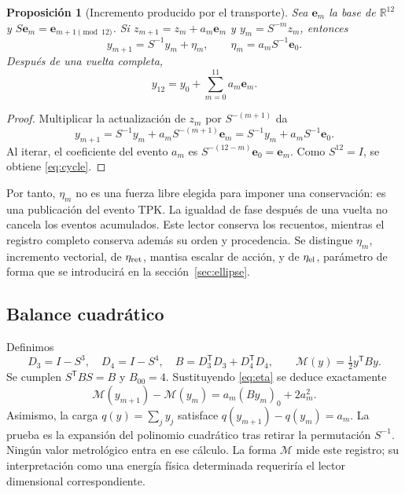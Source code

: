 \documentclass[11pt,a4paper]{article}
\numberwithin{equation}{section}
\newtheorem{proposition}[theorem]{Proposición}
\theoremstyle{definition}
\newcommand{\R}{\mathbb R}
\begin{document}
\begin{proposition}[Incremento producido por el transporte]
Sea $\mathbf e_m$ la base de $\R^{12}$ y
$S\mathbf e_m=\mathbf e_{m+1\pmod{12}}$. Si
$z_{m+1}=z_m+a_m\mathbf e_m$ y $y_m=S^{-m}z_m$, entonces
\begin{equation}
y_{m+1}=S^{-1}y_m+\eta_m,
\qquad
\eta_m=a_mS^{-1}\mathbf e_0.
\label{eq:eta}
\end{equation}
Después de una vuelta completa,
\begin{equation}
y_{12}=y_0+\sum_{m=0}^{11}a_m\mathbf e_m.
\label{eq:cycle}
\end{equation}
\end{proposition}
\begin{proof}
Multiplicar la actualización de $z_m$ por $S^{-(m+1)}$ da
\[
y_{m+1}=S^{-1}y_m+a_mS^{-(m+1)}\mathbf e_m
=S^{-1}y_m+a_mS^{-1}\mathbf e_0.
\]
Al iterar, el coeficiente del evento $a_m$ es
$S^{-(12-m)}\mathbf e_0=\mathbf e_m$. Como $S^{12}=I$,
se obtiene \eqref{eq:cycle}.
\end{proof}

Por tanto, $\eta_m$ no es una fuerza libre elegida para imponer una
conservación: es una publicación del evento TPK. La igualdad de fase
después de una vuelta no cancela los eventos acumulados. Este lector
conserva los recuentos, mientras el registro completo conserva además su
orden y procedencia. Se distingue $\eta_m$, incremento vectorial, de
$\eta_{\rm ret}$, mantisa escalar de acción, y de $\eta_{\rm el}$,
parámetro de forma que se introducirá en la sección~\ref{sec:ellipse}.

\subsection{Balance cuadrático}
Definimos
\[
D_3=I-S^3,\quad D_4=I-S^4,\quad
B=D_3^{\mathsf T}D_3+D_4^{\mathsf T}D_4,\qquad
\mathcal M(y)=\tfrac12 y^{\mathsf T}By.
\]
Se cumplen $S^{\mathsf T}BS=B$ y $B_{00}=4$. Sustituyendo
\eqref{eq:eta} se deduce exactamente
\begin{equation}
\mathcal M(y_{m+1})-\mathcal M(y_m)
=a_m(By_m)_0+2a_m^2.
\end{equation}
Asimismo, la carga $q(y)=\sum_jy_j$ satisface
$q(y_{m+1})-q(y_m)=a_m$.
La prueba es la expansión del polinomio cuadrático tras retirar la
permutación $S^{-1}$. Ningún valor metrológico entra en ese cálculo.
La forma $\mathcal M$ mide este registro; su interpretación como una
energía física determinada requeriría el lector dimensional correspondiente.
\end{document}
